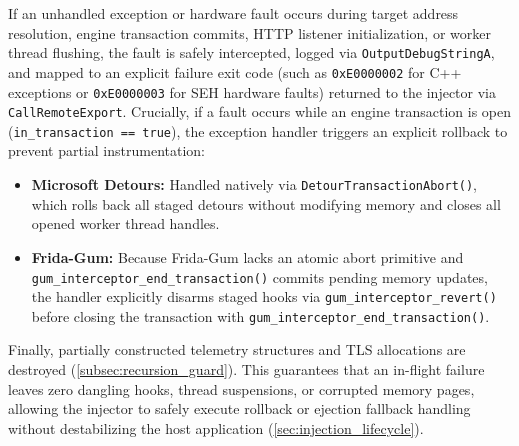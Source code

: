 If an unhandled exception or hardware fault occurs during target address resolution, engine transaction commits, HTTP listener initialization, or worker thread flushing, the fault is safely intercepted, logged via \texttt{OutputDebugStringA}, and mapped to an explicit failure exit code (such as \texttt{0xE0000002} for C++ exceptions or \texttt{0xE0000003} for \ac{SEH} hardware faults) returned to the injector via \texttt{CallRemoteExport}.
Crucially, if a fault occurs while an engine transaction is open (\texttt{in\_transaction == true}), the exception handler triggers an explicit rollback to prevent partial instrumentation:
\begin{itemize}
	\item \textbf{Microsoft Detours:} Handled natively via \texttt{DetourTransactionAbort()}, which rolls back all staged detours without modifying memory and closes all opened worker thread handles.
	\item \textbf{Frida-Gum:} Because Frida-Gum lacks an atomic abort primitive and \texttt{gum\_interceptor\_end\_transaction()} commits pending memory updates, the handler explicitly disarms staged hooks via \texttt{gum\_interceptor\_revert()} before closing the transaction with \texttt{gum\_interceptor\_end\_transaction()}. 
\end{itemize}
Finally, partially constructed telemetry structures and TLS allocations are destroyed (\cref{subsec:recursion_guard}).
This guarantees that an in-flight failure leaves zero dangling hooks, thread suspensions, or corrupted memory pages, allowing the injector to safely execute rollback or ejection fallback handling without destabilizing the host application (\cref{sec:injection_lifecycle}).

